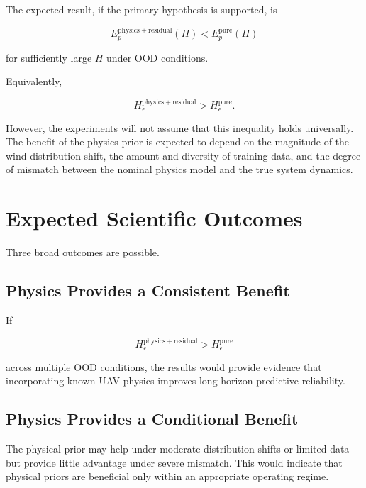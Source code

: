 \documentclass[conference]{IEEEtran}
\begin{document}
The expected result, if the primary hypothesis is supported, is

\begin{equation}
E_p^{\mathrm{physics+residual}}(H)
<
E_p^{\mathrm{pure}}(H)
\end{equation}

for sufficiently large $H$ under OOD conditions.

Equivalently,

\begin{equation}
H_{\epsilon}^{\mathrm{physics+residual}}
>
H_{\epsilon}^{\mathrm{pure}}.
\end{equation}

However, the experiments will not assume that this inequality holds universally. The benefit of the physics prior is expected to depend on the magnitude
of the wind distribution shift, the amount and diversity of training data, and the degree of mismatch between the nominal physics model and
the true system dynamics.



\section{Expected Scientific Outcomes}


Three broad outcomes are possible.

\subsection{Physics Provides a Consistent Benefit}

If

\begin{equation}
H_{\epsilon}^{\mathrm{physics+residual}}
>
H_{\epsilon}^{\mathrm{pure}}
\end{equation}

across multiple OOD conditions, the results would provide evidence that
incorporating known UAV physics improves long-horizon predictive
reliability.


\subsection{Physics Provides a Conditional Benefit}

The physical prior may help under moderate distribution shifts or
limited data but provide little advantage under severe mismatch. This would indicate that physical priors are beneficial only within an
appropriate operating regime.
\end{document}
